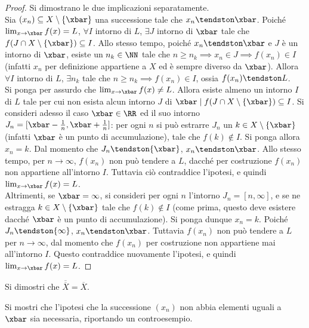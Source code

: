 \documentclass[11pt]{article}
\begin{document}
	\begin{proof}
		Si dimostrano le due implicazioni separatamente. \\
		
		\rightproof Sia $(x_n) \subseteq X \setminus \{\xbar\}$ una successione tale che
		$x_n \tendston \xbar$. Poiché $\lim_{x \to \xbar} f(x) = L$, $\forall I$ intorno di
		$L$, $\exists J$ intorno di $\xbar$ tale che $f(J \cap X \setminus \{\xbar\}) \subseteq I$.
		Allo stesso tempo, poiché $x_n \tendston \xbar$ e $J$ è un intorno di $\xbar$, esiste un $n_k \in \NN$
		tale che $n \geq n_k \implies x_n \in J \implies f(x_n) \in I$ (infatti $x_n$ per definizione
		appartiene a $X$ ed è sempre diverso da $\xbar$). Allora $\forall I$ intorno di $L$, $\exists n_k$
		tale che $n \geq n_k \implies f(x_n) \in I$, ossia $f(x_n) \tendston L$. \\
		
		\leftproof Si ponga per assurdo che $\lim_{x \to \xbar} f(x) \neq L$. Allora esiste almeno
		un intorno $I$ di $L$ tale per cui non esista alcun intorno $J$ di $\xbar \mid f(J \cap X \setminus \{\xbar\}) \subseteq I$. Si consideri adesso il caso $\xbar \in \RR$ ed il suo intorno $J_n = [\xbar - \frac{1}{n}, \xbar + \frac{1}{n}]$: per ogni $n$ si può estrarre $J_n$ un $k \in X \setminus \{\xbar\}$
		(infatti $\xbar$ è un punto di accumulazione), tale che $f(k) \notin I$. Si ponga allora $x_n = k$.
		Dal momento che $J_n \tendston \{\xbar\}$, $x_n \tendston \xbar$. Allo stesso tempo, per $n \to \infty$, $f(x_n)$ non può tendere a $L$, dacché per costruzione $f(x_n)$ non appartiene all'intorno
		$I$. Tuttavia ciò contraddice l'ipotesi, e quindi $\lim_{x \to \xbar} f(x) = L$. \\
		
		Altrimenti, se $\xbar = \infty$, si consideri per ogni $n$ l'intorno $J_n = [n, \infty]$, e se ne
		estragga $k \in X \setminus \{\xbar\}$ tale che $f(k) \notin I$ (come prima, questo deve esistere
		dacché $\xbar$ è un punto di accumulazione). Si ponga dunque $x_n = k$. Poiché $J_n \tendston \{\infty\}$, $x_n \tendston \xbar$. Tuttavia $f(x_n)$ non può tendere a $L$ per $n \to \infty$,
		dal momento che $f(x_n)$ per costruzione non appartiene mai all'intorno $I$. Questo contraddice
		nuovamente l'ipotesi, e quindi $\lim_{x \to \xbar} f(x) = L$.
	\end{proof}
	
	\begin{exercise} Si dimostri che $\overline{\overline{X}} = \overline{X}$.
	\end{exercise}
	
	\begin{exercise} Si mostri che l'ipotesi che la successione $(x_n)$ non abbia elementi uguali
		a $\xbar$ sia necessaria, riportando un controesempio.
	\end{exercise}
\end{document}
